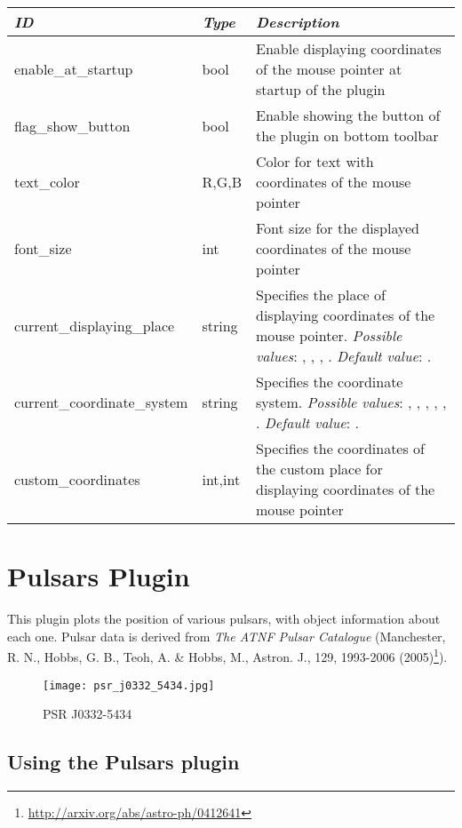 \begin{longtabu} to \textwidth {l|l|X}\toprule
\emph{ID}            & \emph{Type} & \emph{Description}\\\midrule
enable\_at\_startup  & bool & Enable displaying coordinates of the mouse pointer at startup of the plugin\\\midrule
flag\_show\_button   & bool & Enable showing the button of the plugin on bottom toolbar\\\midrule
text\_color          & R,G,B & Color for text with coordinates of the mouse pointer \\\midrule
font\_size           & int & Font size for the displayed coordinates of the mouse pointer \\\midrule
current\_displaying\_place  & string & Specifies the place of displaying coordinates of the mouse pointer. \textit{Possible values}: , , , . \textit{Default value}: . \\\midrule
current\_coordinate\_system & string & Specifies the coordinate system. \textit{Possible values}: , , , , , . \textit{Default value}: . \\\midrule
custom\_coordinates  & int,int & Specifies the coordinates of the custom place for displaying coordinates of the mouse pointer \\\bottomrule
\end{longtabu}

\newpage

\section{Pulsars Plugin}
\label{sec:plugins:Pulsars}

This plugin plots the position of various pulsars, with object information about each one. Pulsar data is derived from \textit{The ATNF Pulsar Catalogue} (Manchester, R. N., Hobbs, G. B., Teoh, A. \& Hobbs, M., Astron. J., 129, 1993-2006 (2005)\footnote{\url{http://arxiv.org/abs/astro-ph/0412641}}).

\begin{figure}[h]
\texttt{[image: psr\_j0332\_5434.jpg]}
\label{fig:PSR_J0332-5434}
\caption{PSR J0332-5434}
\end{figure}

\subsection{Using the Pulsars plugin}
\label{sec:plugins:Pulsars:using}

